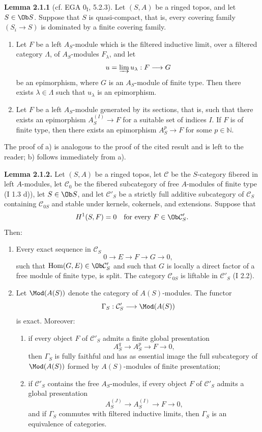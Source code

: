 \textbf{Lemma 2.1.1} (cf. EGA $0_{\mathrm I}$, 5.2.3). Let $(S,A)$ be a ringed topos, and let $S\in\Ob S$. Suppose that $S$ is quasi-compact, that is, every covering family $(S_i\to S)$ is dominated by a finite covering family.
\begin{enumerate}[label=\alph*)]
\item Let $F$ be a left $A_S$-module which is the filtered inductive limit, over a filtered category $\Lambda$, of $A_S$-modules $F_\lambda$, and let
\[
u=\varinjlim u_\lambda:F\longrightarrow G
\]
be an epimorphism, where $G$ is an $A_S$-module of finite type. Then there exists $\lambda\in\Lambda$ such that $u_\lambda$ is an epimorphism.
\item Let $F$ be a left $A_S$-module generated by its sections, that is, such that there exists an epimorphism $A_S^{(I)}\to F$ for a suitable set of indices $I$. If $F$ is of finite type, then there exists an epimorphism $A_S^p\to F$ for some $p\in\mathbb N$.
\end{enumerate}
The proof of a) is analogous to the proof of the cited result and is left to the reader; b) follows immediately from a).

\textbf{Lemma 2.1.2.} Let $(S,A)$ be a ringed topos, let $\mathcal C$ be the $S$-category fibered in left $A$-modules, let $\mathcal C_0$ be the fibered subcategory of free $A$-modules of finite type (I 1.3 d)), let $S\in\Ob S$, and let $\mathcal C'_S$ be a strictly full additive subcategory of $\mathcal C_S$ containing $\mathcal C_{0S}$ and stable under kernels, cokernels, and extensions. Suppose that
\[
H^1(S,F)=0\quad\text{for every }F\in\Ob\mathcal C'_S.
\]
Then:
\begin{enumerate}[label=\alph*)]
\item Every exact sequence in $\mathcal C_S$
\[
0\longrightarrow E\longrightarrow F\longrightarrow G\longrightarrow0,
\]
such that $\operatorname{Hom}(G,E)\in\Ob\mathcal C'_S$ and such that $G$ is locally a direct factor of a free module of finite type, is split. The category $\mathcal C_{0S}$ is liftable in $\mathcal C'_S$ (I 2.2).
\item Let $\Mod(A(S))$ denote the category of $A(S)$-modules. The functor
\[
\Gamma_S:\mathcal C'_S\longrightarrow\Mod(A(S))
\]
is exact. Moreover:
\begin{enumerate}[label=(\roman*)]
\item if every object $F$ of $\mathcal C'_S$ admits a finite global presentation
\[
A_S^q\longrightarrow A_S^p\longrightarrow F\longrightarrow0,
\]
then $\Gamma_S$ is fully faithful and has as essential image the full subcategory of $\Mod(A(S))$ formed by $A(S)$-modules of finite presentation;
\item if $\mathcal C'_S$ contains the free $A_S$-modules, if every object $F$ of $\mathcal C'_S$ admits a global presentation
\[
A_S^{(J)}\longrightarrow A_S^{(I)}\longrightarrow F\longrightarrow0,
\]
and if $\Gamma_S$ commutes with filtered inductive limits, then $\Gamma_S$ is an equivalence of categories.
\end{enumerate}
\end{enumerate}

